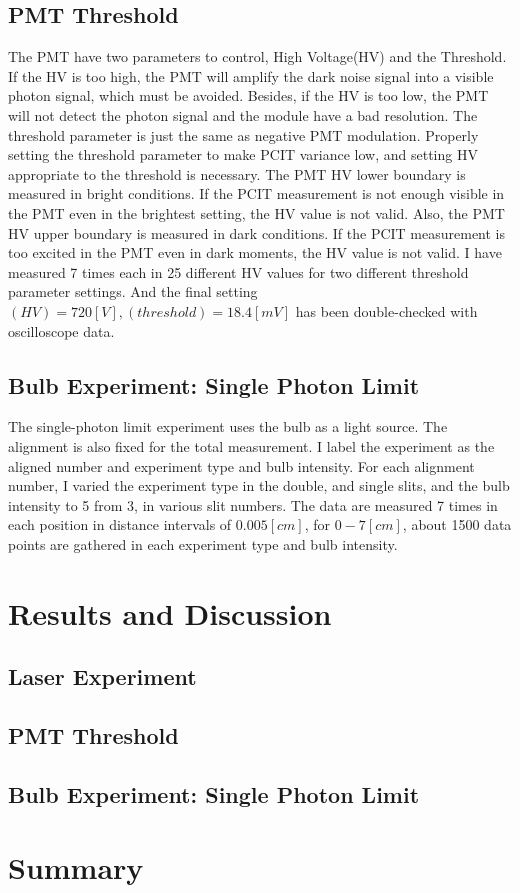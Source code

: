 \documentclass{article}
\begin{document}
\subsection{PMT Threshold}
The PMT have two parameters to control, High Voltage(HV) and the Threshold.
If the HV is too high, the PMT will amplify the dark noise signal into a visible photon signal, which must be avoided.
Besides, if the HV is too low, the PMT will not detect the photon signal and the module have a bad resolution.
The threshold parameter is just the same as negative PMT modulation.
Properly setting the threshold parameter to make PCIT variance low, and setting HV appropriate to the threshold is necessary.
The PMT HV lower boundary is measured in bright conditions.
If the PCIT measurement is not enough visible in the PMT even in the brightest setting, the HV value is not valid.
Also, the PMT HV upper boundary is measured in dark conditions.
If the PCIT measurement is too excited in the PMT even in dark moments, the HV value is not valid.
I have measured 7 times each in 25 different HV values for two different threshold parameter settings.
And the final setting $(HV) = 720 [V], (threshold) = 18.4 [mV]$ has been double-checked with oscilloscope data.

\subsection{Bulb Experiment: Single Photon Limit}
The single-photon limit experiment uses the bulb as a light source.
The alignment is also fixed for the total measurement.
I label the experiment as the aligned number and experiment type and bulb intensity.
For each alignment number, I varied the experiment type in the double, and single slits, and the bulb intensity to 5 from 3, in various slit numbers.
The data are measured 7 times in each position in distance intervals of $0.005 [cm]$, for $0 - 7 [cm]$, about 1500 data points are gathered in each experiment type and bulb intensity.

\section{Results and Discussion}
\subsection{Laser Experiment}

\subsection{PMT Threshold}

\subsection{Bulb Experiment: Single Photon Limit}

\section{Summary}






\end{document}
